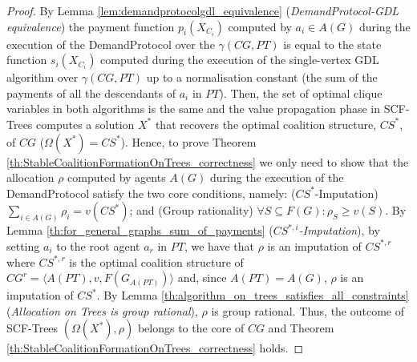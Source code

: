 \documentclass{aamas2012}
\begin{document}
\begin{proof} 
By Lemma \ref{lem:demandprotocolgdl_equivalence} (\emph{DemandProtocol-GDL equivalence}) the payment function $p_i(X_{C_i})$ computed by $a_i\in
A(G)$ during the execution of the DemandProtocol over the $\gamma(CG,PT)$ is equal to the state function $s_i(X_{C_i})$ computed during
the execution of the single-vertex GDL algorithm over $\gamma(CG,PT)$ up to a
normalisation constant (the sum of the payments of all the descendants of $a_i$
in $PT$). Then,
the set of optimal clique variables in both algorithms is
the same and the value propagation phase in SCF-Trees computes a solution $X^*$
that recovers the optimal coalition structure, $CS^*$, of $CG$
($\Omega(X^*)=CS^*$).
Hence, to prove Theorem \ref{th:StableCoalitionFormationOnTrees_correctness} we
only need to show that the allocation $\rho$ computed by agents $A(G)$ during the execution of the DemandProtocol satisfy the two core
conditions, namely: ($CS^*$-Imputation) $\sum_{i\in A(G)}\rho_i=v(CS^*)$; and
(Group rationality)  $\forall S \subseteq F(G): \rho_S \geq v(S)$.
By Lemma \ref{th:for_general_graphs_sum_of_payments}
(\emph{$CS^{*,i}$-Imputation}), by setting $a_i$ to the root agent $a_r$ in
$PT$, we have that $\rho$ is an imputation of $CS^{*,r}$ where $CS^{*,r}$ is the
optimal coalition structure of $CG^r=\langle A(PT), v,F(G_{A(PT)})\rangle$
and, since $A(PT)=A(G)$, $\rho$ is an
imputation of $CS^*$. By Lemma
\ref{th:algorithm_on_trees_satisfies_all_constraints} (\emph{Allocation on
Trees is group rational}), $\rho$ is group rational.
Thus, the outcome of SCF-Trees $(\Omega(X^*),\rho)$ belongs to the core of $CG$
and Theorem \ref{th:StableCoalitionFormationOnTrees_correctness} holds.
\end{proof}
\end{document}
